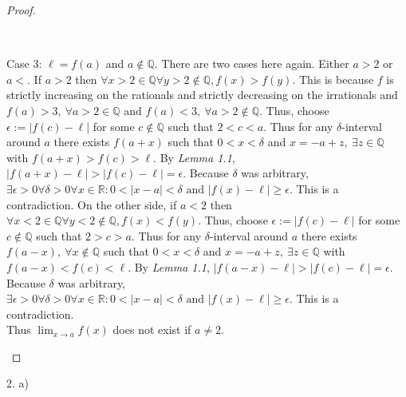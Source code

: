 \documentclass[11pt]{article}
\newcommand{\R}{\mathbb{R}}
\newenvironment{myproof}
{\begin{proof} \begin{adjustwidth}{3em}{0pt}$ $\par\nobreak\ignorespaces}
{\end{adjustwidth} \end{proof}}
\begin{document}
\begin{flushleft}
\begin{myproof}
\bigskip
Case 3: $\ell = f(a)$ and $a \notin \mathbb{Q}$. There are two cases here again. Either $a>2$ or $a<$. If $a > 2$ then $\forall x > 2 \in \mathbb{Q} \forall y > 2 \notin \mathbb{Q}, f(x)>f(y)$. This is because $f$ is strictly increasing on the rationals and strictly decreasing on the irrationals and $f(a) > 3, \ \forall a > 2 \in \mathbb{Q}$ and $f(a) < 3, \ \forall a > 2 \notin \mathbb{Q}$. Thus, choose $\epsilon:= |f(c)-\ell|$ for some $c \notin \mathbb{Q}$ such that $2 < c < a$. Thus for any $\delta$-interval around $a$ there exists $f(a+x)$ such that $0<x< \delta$ and $x = -a + z, \ \exists z \in \mathbb{Q}$ with $f(a+x) > f(c) > \ell$.  By \textit{Lemma 1.1}, $|f(a+x) - \ell| > |f(c) - \ell| = \epsilon$. Because $\delta$ was arbitrary, $\exists \epsilon > 0 \forall \delta > 0 \forall x \in \R: 0<|x-a|< \delta \text{ and } |f(x) - \ell| \geq \epsilon$. This is a contradiction. On the other side, if $a < 2$ then $\forall x < 2 \in \mathbb{Q} \forall y < 2 \notin \mathbb{Q}, f(x)<f(y)$. Thus, choose $\epsilon:= |f(c)-\ell|$ for some $c \notin \mathbb{Q}$ such that $2 > c > a$. Thus for any $\delta$-interval around $a$ there exists $f(a-x), \ \forall x \notin \mathbb{Q}$ such that $0<x<\delta$ and $x = -a + z, \ \exists z \in \mathbb{Q}$ with $f(a-x) < f(c) < \ell$. By \textit{Lemma 1.1}, $|f(a-x) - \ell| > |f(c) - \ell| = \epsilon$. Because $\delta$ was arbitrary, $\exists \epsilon > 0 \forall \delta > 0 \forall x \in \R: 0<|x-a|< \delta \text{ and } |f(x) - \ell| \geq \epsilon$. This is a contradiction.\\
\bigskip
Thus $\lim_{x\to a}f(x)$ does not exist if $a \neq 2$.
\end{myproof}

\newpage

2. a)


\end{flushleft}
\end{document}
